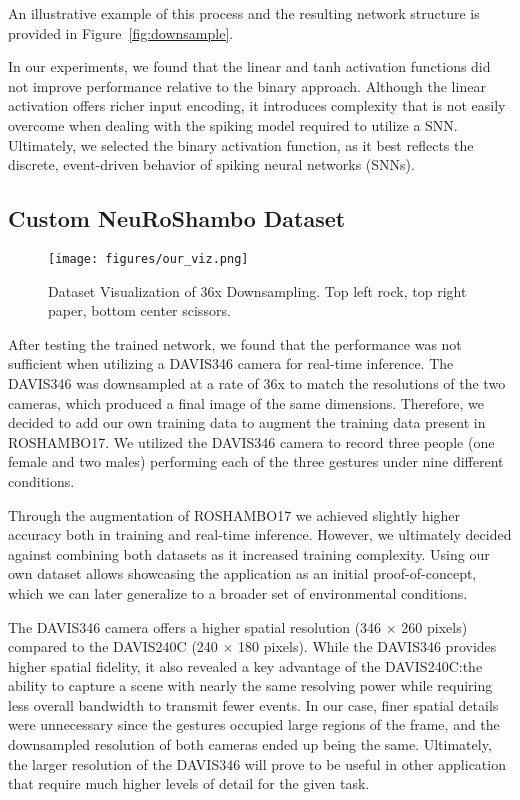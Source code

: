 \documentclass[conference]{IEEEtran}
\begin{document}
An illustrative example of this process and the resulting network structure is provided in Figure~\ref{fig:downsample}.

In our experiments, we found that the linear and tanh activation functions did not improve performance relative to the binary approach. Although the linear activation offers richer input encoding, it introduces complexity that is not easily overcome when dealing with the spiking model required to utilize a SNN. Ultimately, we selected the binary activation function, as it best reflects the discrete, event-driven behavior of spiking neural networks (SNNs).

\subsection{Custom NeuRoShambo Dataset}

\begin{figure}[!ht]
    \centering    \texttt{[image: figures/our\_viz.png]}
    \caption{Dataset Visualization of 36x Downsampling. Top left rock, top right paper, bottom center scissors.}
    \label{fig:our_data}
\end{figure}

After testing the trained network, we found that the performance was not sufficient when utilizing a DAVIS346 camera for real-time inference. The DAVIS346 was downsampled at a rate of 36x to match the resolutions of the two cameras, which produced a final image of the same dimensions. Therefore, we decided to add our own training data to augment the training data present in ROSHAMBO17. We utilized the DAVIS346 camera to record three people (one female and two males) performing each of the three gestures under nine different conditions.

Through the augmentation of ROSHAMBO17 we achieved slightly higher accuracy both in training and real-time inference. However, we ultimately decided against combining both datasets as it increased training complexity. Using our own dataset allows showcasing the application as an initial proof-of-concept, which we can later generalize to a broader set of environmental conditions.

The DAVIS346 camera offers a higher spatial resolution (346 $\times$ 260 pixels) compared to the DAVIS240C (240 $\times$ 180 pixels). While the DAVIS346 provides higher spatial fidelity, it also revealed a key advantage of the DAVIS240C:\@ the ability to capture a scene with nearly the same resolving power while requiring less overall bandwidth to transmit fewer events. In our case, finer spatial details were unnecessary since the gestures occupied large regions of the frame, and the downsampled resolution of both cameras ended up being the same. Ultimately, the larger resolution of the DAVIS346 will prove to be useful in other application that require much higher levels of detail for the given task.
\end{document}
